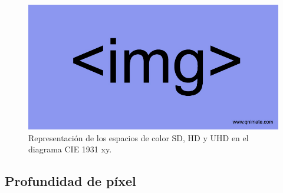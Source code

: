 \documentclass[a4paper, 12pt]{report}
\begin{document}
\begin{figure}[H]
    \centering
    \includegraphics[width=14cm, keepaspectratio]{img/no_image.jpg}
    \caption{ Representación de los espacios de color SD, HD y UHD en el diagrama CIE 1931 xy.}
    \label{fig:cie_diagram}
\end{figure} 

\subsection{Profundidad de píxel}
\label{subsec:color_depth}

\begin{table}[H]
\centering
{}
\caption{Profundidad de píxel en los sistemas de televisión SD, HD y UHD}
\label{table:bit_depth}
\end{table}
\end{document}
